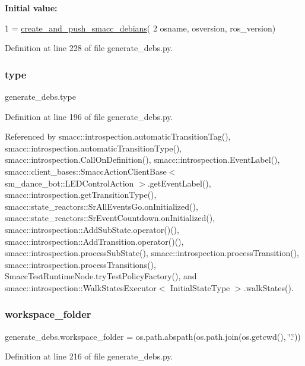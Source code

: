 {\bfseries Initial value\+:}
\begin{DoxyCode}
1 =  \hyperlink{namespacegenerate__debs_af7237c463c8e5b4df369e6befc154c50}{create\_and\_push\_smacc\_debians}(
2         osname, osversion, ros\_version)
\end{DoxyCode}


Definition at line 228 of file generate\+\_\+debs.\+py.

\mbox{\label{namespacegenerate__debs_a50bc9a7ecac9584553e089a448bcde58}} 
\subsubsection{\texorpdfstring{type}{type}}
{\footnotesize\ttfamily generate\+\_\+debs.\+type}



Definition at line 196 of file generate\+\_\+debs.\+py.



Referenced by smacc\+::introspection.\+automatic\+Transition\+Tag(), smacc\+::introspection.\+automatic\+Transition\+Type(), smacc\+::introspection.\+Call\+On\+Definition(), smacc\+::introspection.\+Event\+Label(), smacc\+::client\+\_\+bases\+::\+Smacc\+Action\+Client\+Base$<$ sm\+\_\+dance\+\_\+bot\+::\+L\+E\+D\+Control\+Action $>$.\+get\+Event\+Label(), smacc\+::introspection.\+get\+Transition\+Type(), smacc\+::state\+\_\+reactors\+::\+Sr\+All\+Events\+Go.\+on\+Initialized(), smacc\+::state\+\_\+reactors\+::\+Sr\+Event\+Countdown.\+on\+Initialized(), smacc\+::introspection\+::\+Add\+Sub\+State.\+operator()(), smacc\+::introspection\+::\+Add\+Transition.\+operator()(), smacc\+::introspection.\+process\+Sub\+State(), smacc\+::introspection.\+process\+Transition(), smacc\+::introspection.\+process\+Transitions(), Smacc\+Test\+Runtime\+Node.\+try\+Test\+Policy\+Factory(), and smacc\+::introspection\+::\+Walk\+States\+Executor$<$ Initial\+State\+Type $>$.\+walk\+States().

\mbox{\label{namespacegenerate__debs_acb69863b90257249a30e43ebacfb8bd8}} 
\subsubsection{\texorpdfstring{workspace\+\_\+folder}{workspace\_folder}}
{\footnotesize\ttfamily generate\+\_\+debs.\+workspace\+\_\+folder = os.\+path.\+abspath(os.\+path.\+join(os.\+getcwd(), \char`\"{}.\char`\"{}))}



Definition at line 216 of file generate\+\_\+debs.\+py.

